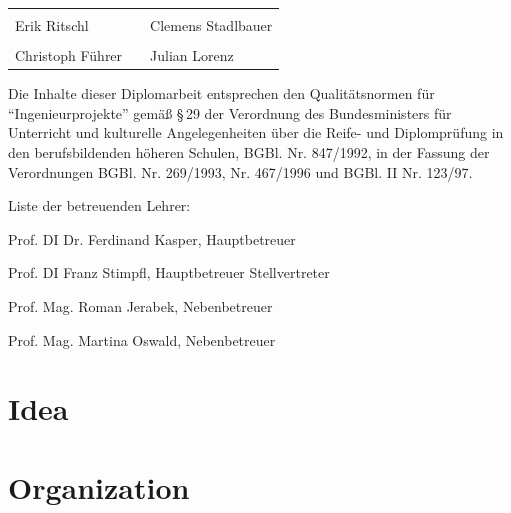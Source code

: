 \documentclass[12pt,a4paper,english,oneside,openright,DIV=12,BCOR=1cm]{scrbook}
\begin{document}
\vfill
\noindent\begin{tabular}{p{.45\linewidth}p{.1\linewidth}p{.45\linewidth}}
	\dotfill & & \dotfill \\
	Erik Ritschl & & Clemens Stadlbauer \\[16ex]
	\dotfill & & \dotfill \\
	Christoph Führer & & Julian Lorenz
\end{tabular}
\vfill



\thispagestyle{fancy}

Die Inhalte dieser Diplomarbeit entsprechen den Qualitätsnormen für
``Ingenieurprojekte'' gemäß §\,29 der Verordnung des Bundesministers
für Unterricht und kulturelle Angelegenheiten über die Reife- und
Diplomprüfung in den berufsbildenden höheren Schulen, BGBl. Nr. 847/1992,
in der Fassung der Verordnungen BGBl. Nr. 269/1993, Nr. 467/1996 und
BGBl. II Nr. 123/97.

\vspace{10mm}


Liste der betreuenden Lehrer:

Prof. DI Dr. Ferdinand Kasper, Hauptbetreuer

Prof. DI Franz Stimpfl, Hauptbetreuer Stellvertreter

Prof. Mag. Roman Jerabek, Nebenbetreuer

Prof. Mag. Martina Oswald, Nebenbetreuer %

\vspace{10mm}

\renewcommand*{\chapterpagestyle}{fancy}
\cleardoublepage{}
\tableofcontents{}
\cleardoublepage{}
\listoftables
\cleardoublepage{}
\listoffigures
\cleardoublepage{}
\listoflistings

\cleardoublepage{}

\pagestyle{fancy}
\thispagestyle{fancy}

\newcommand{\tfpath}[1]{\textbf{#1}}
\newcommand{\tfcode}[1]{\texttt{\detokenize{#1}}}

\chapter{Idea}


\chapter{Organization}

\end{document}
